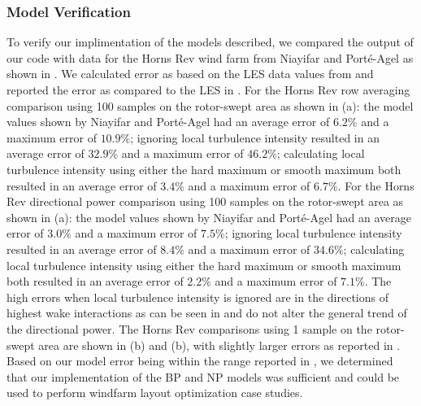 \documentclass[conf]{new-aiaa}
\begin{document}
\subsubsection{Model Verification}
To verify our implimentation of the models described, we compared the output of our code with data for the Horns Rev wind farm from Niayifar and Port\'{e}-Agel \cite{niayifar2016} as shown in . We calculated error as based on the LES data values from \cite{niayifar2016} and reported the error as compared to the LES in . For the Horns Rev row averaging comparison using 100 samples on the rotor-swept area as shown in (a): the model values shown by Niayifar and Port\'{e}-Agel had an average error of $6.2\%$ and a maximum error of $10.9\%$; ignoring local turbulence intensity resulted in an average error of $32.9\%$ and a maximum error of $46.2\%$; calculating local turbulence intensity using either the hard maximum or smooth maximum both resulted in an average error of $3.4\%$ and a maximum error of $6.7\%$.  For the Horns Rev directional power comparison using 100 samples on the rotor-swept area as shown in (a): the model values shown by Niayifar and Port\'{e}-Agel had an average error of $3.0\%$ and a maximum error of $7.5\%$; ignoring local turbulence intensity resulted in an average error of $8.4\%$ and a maximum error of $34.6\%$; calculating local turbulence intensity using either the hard maximum or smooth maximum both resulted in an average error of $2.2\%$ and a maximum error of $7.1\%$. The high errors when local turbulence intensity is ignored are in the directions of highest wake interactions as can be seen in  and do not alter the general trend of the directional power. The Horns Rev comparisons using 1 sample on the rotor-swept area are shown in (b) and (b), with slightly larger errors as reported in . Based on our model error being within the range reported in \cite{niayifar2016}, we determined that our implementation of the BP and NP models was sufficient and could be used to perform windfarm layout optimization case studies.
\end{document}
